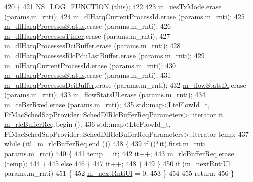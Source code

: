 \begin{DoxyCode}
420 \{
421   \hyperlink{log-macros-disabled_8h_a90b90d5bad1f39cb1b64923ea94c0761}{NS\_LOG\_FUNCTION} (\textcolor{keyword}{this});
422 
423   \hyperlink{classns3_1_1FdBetFfMacScheduler_a1a3c593a10fbac9008cb1b991746dda2}{m\_uesTxMode}.erase (params.m\_rnti);
424   \hyperlink{classns3_1_1FdBetFfMacScheduler_a7c1cfb93fd3fa63e6811486c023934c2}{m\_dlHarqCurrentProcessId}.erase (params.m\_rnti);
425   \hyperlink{classns3_1_1FdBetFfMacScheduler_a93d8bf3298e9b289d9fcf70571b27b78}{m\_dlHarqProcessesStatus}.erase  (params.m\_rnti);
426   \hyperlink{classns3_1_1FdBetFfMacScheduler_a78314b001be9986429ecb13daac0885a}{m\_dlHarqProcessesTimer}.erase (params.m\_rnti);
427   \hyperlink{classns3_1_1FdBetFfMacScheduler_af37ecddc35da4f5a44cc0c50b08a4a96}{m\_dlHarqProcessesDciBuffer}.erase  (params.m\_rnti);
428   \hyperlink{classns3_1_1FdBetFfMacScheduler_ace3cb887417444023ca2f39d5de6a7cf}{m\_dlHarqProcessesRlcPduListBuffer}.erase  (params.m\_rnti);
429   \hyperlink{classns3_1_1FdBetFfMacScheduler_a12a5dedfa74cd590624828dcffafa855}{m\_ulHarqCurrentProcessId}.erase  (params.m\_rnti);
430   \hyperlink{classns3_1_1FdBetFfMacScheduler_a7abd82b962ddf3b3fb688de9528bc04a}{m\_ulHarqProcessesStatus}.erase  (params.m\_rnti);
431   \hyperlink{classns3_1_1FdBetFfMacScheduler_a9b0359136a7f50a8baf80b3b17367869}{m\_ulHarqProcessesDciBuffer}.erase  (params.m\_rnti);
432   \hyperlink{classns3_1_1FdBetFfMacScheduler_a347c3f4c314a6791eef27d768927392a}{m\_flowStatsDl}.erase  (params.m\_rnti);
433   \hyperlink{classns3_1_1FdBetFfMacScheduler_ab32cc321792e04b643a0c976d79ba8b6}{m\_flowStatsUl}.erase  (params.m\_rnti);
434   \hyperlink{classns3_1_1FdBetFfMacScheduler_a86411f2dd593676d88de396ef4d0b6e5}{m\_ceBsrRxed}.erase (params.m\_rnti);
435   std::map<LteFlowId\_t, FfMacSchedSapProvider::SchedDlRlcBufferReqParameters>::iterator it = 
      \hyperlink{classns3_1_1FdBetFfMacScheduler_a77bc6d5b9a64164f6974cc8d8b0318c0}{m\_rlcBufferReq}.begin ();
436   std::map<LteFlowId\_t, FfMacSchedSapProvider::SchedDlRlcBufferReqParameters>::iterator temp;
437   \textcolor{keywordflow}{while} (it!=\hyperlink{classns3_1_1FdBetFfMacScheduler_a77bc6d5b9a64164f6974cc8d8b0318c0}{m\_rlcBufferReq}.end ())
438     \{
439       \textcolor{keywordflow}{if} ((*it).first.m\_rnti == params.m\_rnti)
440         \{
441           temp = it;
442           it++;
443           \hyperlink{classns3_1_1FdBetFfMacScheduler_a77bc6d5b9a64164f6974cc8d8b0318c0}{m\_rlcBufferReq}.erase (temp);
444         \}
445       \textcolor{keywordflow}{else}
446         \{
447           it++;
448         \}
449     \}
450   \textcolor{keywordflow}{if} (\hyperlink{classns3_1_1FdBetFfMacScheduler_ade4e2b997a835d6205e7275d58884c41}{m\_nextRntiUl} == params.m\_rnti)
451     \{
452       \hyperlink{classns3_1_1FdBetFfMacScheduler_ade4e2b997a835d6205e7275d58884c41}{m\_nextRntiUl} = 0;
453     \}
454 
455   \textcolor{keywordflow}{return};
456 \}
\end{DoxyCode}



